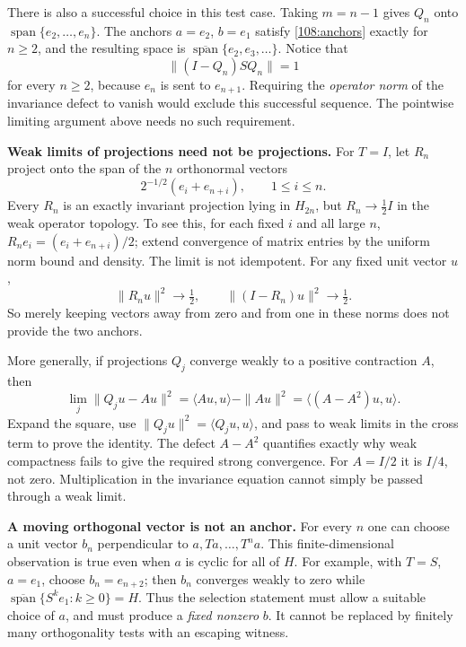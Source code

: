 \documentclass[11pt,a4paper]{article}
\numberwithin{equation}{section}
\begin{document}
There is also a successful choice in this test case. Taking $m=n-1$ gives
$Q_n$ onto $\operatorname{span}\{e_2,\ldots,e_n\}$. The anchors $a=e_2$,
$b=e_1$ satisfy \eqref{108:anchors} exactly for $n\geq2$, and the resulting
space is $\overline{\operatorname{span}}\{e_2,e_3,\ldots\}$. Notice that
\[
 \|(I-Q_n)SQ_n\|=1
\]
for every $n\geq2$, because $e_n$ is sent to $e_{n+1}$. Requiring the
\emph{operator norm} of the invariance defect to vanish would exclude this
successful sequence. The pointwise limiting argument above needs no such
requirement.

\textbf{Weak limits of projections need not be projections.}
For $T=I$, let $R_n$ project onto the span of the $n$ orthonormal vectors
\[
 2^{-1/2}(e_i+e_{n+i}),\qquad1\leq i\leq n.
\]
Every $R_n$ is an exactly invariant projection lying in $H_{2n}$, but
$R_n\to\tfrac12 I$ in the weak operator topology. To see this, for each fixed
$i$ and all large $n$,
$R_ne_i=(e_i+e_{n+i})/2$; extend convergence of matrix entries by the uniform
norm bound and density. The limit is not idempotent. For any fixed unit
vector $u$,
\[
 \|R_nu\|^2\to\tfrac12,
 \qquad\|(I-R_n)u\|^2\to\tfrac12.
\]
So merely keeping vectors away from zero and from one in these norms does
not provide the two anchors.

More generally, if projections $Q_j$ converge weakly to a positive
contraction $A$, then
\begin{equation}\label{108:variance}
 \lim_j\|Q_ju-Au\|^2
 =\langle Au,u\rangle-\|Au\|^2
 =\langle(A-A^2)u,u\rangle.
\end{equation}
Expand the square, use $\|Q_ju\|^2=\langle Q_ju,u\rangle$, and pass to
weak limits in the cross term to prove the identity. The defect $A-A^2$
quantifies exactly why weak compactness fails to give the required strong
convergence. For $A=I/2$ it is $I/4$, not zero. Multiplication in the
invariance equation cannot simply be passed through a weak limit.

\textbf{A moving orthogonal vector is not an anchor.}
For every $n$ one can choose a unit vector $b_n$ perpendicular to
$a,Ta,\ldots,T^na$. This finite-dimensional observation is true even when
$a$ is cyclic for all of $H$. For example, with $T=S$, $a=e_1$, choose
$b_n=e_{n+2}$; then $b_n$ converges weakly to zero while
$\overline{\operatorname{span}}\{S^ke_1:k\geq0\}=H$.
Thus the selection statement must allow a suitable choice of $a$, and must
produce a \emph{fixed nonzero} $b$. It cannot be replaced by finitely many
orthogonality tests with an escaping witness.
\end{document}
